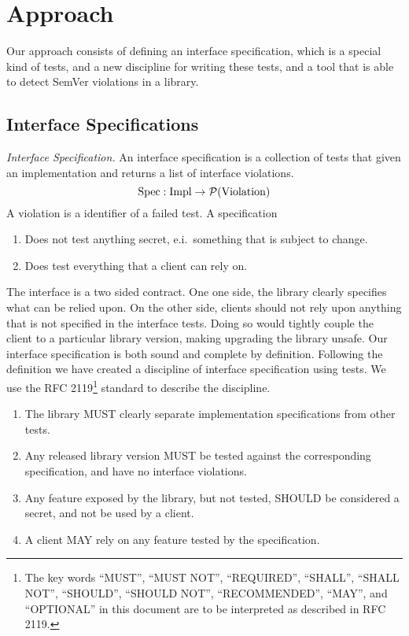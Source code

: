 \section{Approach}

Our approach consists of defining an interface specification, which is a
special kind of tests, and a new discipline for writing these tests, and a tool
that is able to detect SemVer violations in a library.

\subsection{Interface Specifications}

\begin{definition}\textit{Interface Specification.}
An interface specification is a collection of tests that given an
implementation and returns a list of interface violations. 
$$\text{Spec} : \text{Impl} \to \mathcal{P}(\text{Violation})$$
A violation is a identifier of a failed test. A specification
\begin{enumerate}
    \item Does not test anything secret, e.i.\ something that is subject to change.
    \item Does test everything that a client can rely on.  
\end{enumerate}
\end{definition}

The interface is a two sided contract. One one side, the library
clearly specifies what can be relied upon. On the other side, clients
should not rely upon anything that is not specified in the interface
tests.  Doing so would tightly couple the client to a particular
library version, making upgrading the library unsafe. Our interface
specification is both sound and complete by definition.  Following the
definition we have created a discipline of interface specification
using tests. We use the RFC 2119\footnote{The key words ``MUST'',
  ``MUST NOT'', ``REQUIRED'', ``SHALL'', ``SHALL NOT'', ``SHOULD'',
  ``SHOULD NOT'', ``RECOMMENDED'', ``MAY'', and ``OPTIONAL'' in this
  document are to be interpreted as described in RFC
  2119\cite{rfc2119}.} standard to describe the discipline.

\begin{enumerate}
    \item The library MUST clearly separate implementation specifications from
    other tests.
    \item Any released library version MUST be tested against the corresponding
    specification, and have no interface violations.
    \item Any feature exposed by the library, but not tested, SHOULD be
    considered a secret, and not be used by a client.
    \item A client MAY rely on any feature tested by the specification.
\end{enumerate}

